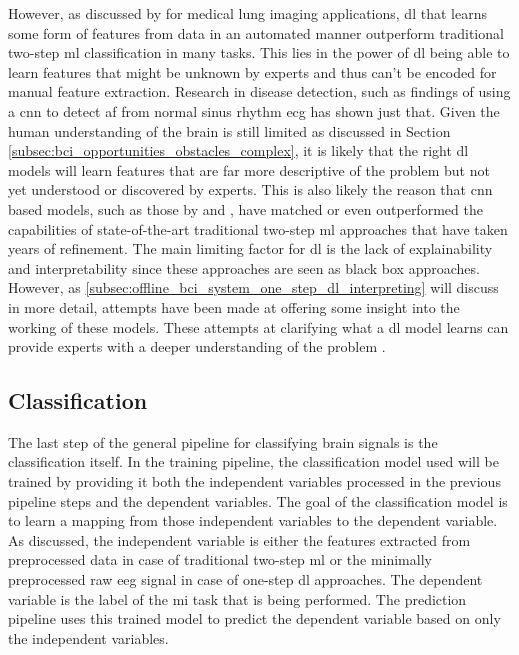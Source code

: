 However, as discussed by \citet{CAD_ml_dl_kbs} for medical lung imaging applications, \gls{dl} that learns some form of features from data in an automated manner outperform traditional two-step \gls{ml} classification in many tasks.
This lies in the power of \gls{dl} being able to learn features that might be unknown by experts and thus can't be encoded for manual feature extraction.
Research in disease detection, such as \citet{attia} findings of using a \gls{cnn} to detect \gls{af} from normal sinus rhythm \gls{ecg} has shown just that.
Given the human understanding of the brain is still limited as discussed in Section \ref{subsec:bci_opportunities_obstacles_complex}, it is likely that the right \gls{dl} models will learn features that are far more descriptive of the problem but not yet understood or discovered by experts.
This is also likely the reason that \gls{cnn} based models, such as those by \citet{eeg_model_eegnet} and \citet{eeg_model_hbm}, have matched or even outperformed the capabilities of state-of-the-art traditional two-step \gls{ml} approaches that have taken years of refinement.
The main limiting factor for \gls{dl} is the lack of explainability and interpretability since these approaches are seen as black box approaches.
However, as \ref{subsec:offline_bci_system_one_step_dl_interpreting} will discuss in more detail, attempts have been made at offering some insight into the working of these models.
These attempts at clarifying what a \gls{dl} model learns can provide experts with a deeper understanding of the problem \citep{dl_book}.



\subsection{Classification}
\label{subsec:processing_signals_general_pipeline_classification}

The last step of the general pipeline for classifying brain signals is the classification itself.
In the training pipeline, the classification model used will be trained by providing it both the independent variables processed in the previous pipeline steps and the dependent variables.
The goal of the classification model is to learn a mapping from those independent variables to the dependent variable.
As discussed, the independent variable is either the features extracted from preprocessed data in case of traditional two-step \gls{ml} or the minimally preprocessed raw \gls{eeg} signal in case of one-step \gls{dl} approaches.
The dependent variable is the label of the \gls{mi} task that is being performed.
The prediction pipeline uses this trained model to predict the dependent variable based on only the independent variables.

